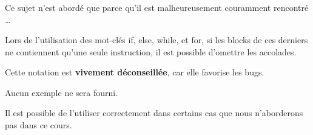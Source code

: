 \begin{frame}[containsverbatim]
  \frametitle{\secname}
  \framesubtitle{\subsecname}

  Ce sujet n'est abordé que parce qu'il est malheureusement couramment rencontré \ldots
  \vspace{0.5cm}
  \par
  Lors de l'utilisation des mot-clés if, else, while, et for, si les blocks de ces derniers ne contiennent qu'une seule instruction, il est possible d'omettre les
  accolades.
  \vspace{0.5cm}
  \par
  Cette notation est \textbf{vivement déconseillée}, car elle favorise les bugs. 
  \par
  Aucun exemple ne sera fourni. 
  \par
  Il est possible de l'utiliser correctement dans certains cas que nous n'aborderons pas dans ce cours.
\end{frame}

